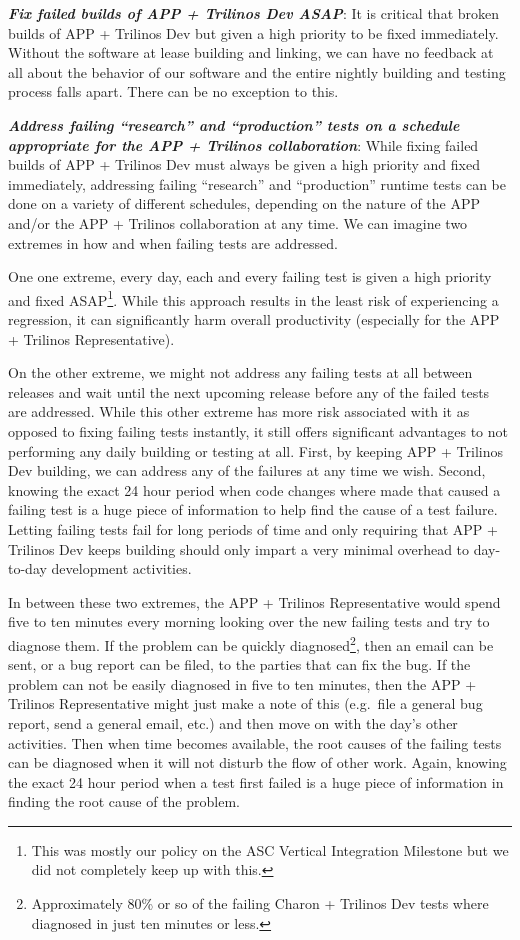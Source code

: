\documentclass[pdf,ps2pdf,11pt]{SANDreport}
\begin{document}
{}\textit{\textbf{Fix failed builds of APP + Trilinos Dev ASAP}}: It is
critical that broken builds of APP + Trilinos Dev but given a high priority to
be fixed immediately.  Without the software at lease building and linking, we
can have no feedback at all about the behavior of our software and the entire
nightly building and testing process falls apart.  There can be no exception
to this.

{}\textit{\textbf{Address failing ``research'' and ``production'' tests on a
schedule appropriate for the APP + Trilinos collaboration}}: While fixing
failed builds of APP + Trilinos Dev must always be given a high priority and
fixed immediately, addressing failing ``research'' and ``production'' runtime
tests can be done on a variety of different schedules, depending on the nature
of the APP and/or the APP + Trilinos collaboration at any time.  We can
imagine two extremes in how and when failing tests are addressed.

One one extreme, every day, each and every failing test is given a high
priority and fixed ASAP\footnote{This was mostly our policy on the ASC
Vertical Integration Milestone but we did not completely keep up with this.}.
While this approach results in the least risk of experiencing a regression, it
can significantly harm overall productivity (especially for the APP + Trilinos
Representative).

On the other extreme, we might not address any failing tests at all between
releases and wait until the next upcoming release before any of the failed
tests are addressed.  While this other extreme has more risk associated with
it as opposed to fixing failing tests instantly, it still offers significant
advantages to not performing any daily building or testing at all.  First, by
keeping APP + Trilinos Dev building, we can address any of the failures at any
time we wish.  Second, knowing the exact 24 hour period when code changes
where made that caused a failing test is a huge piece of information to help
find the cause of a test failure.  Letting failing tests fail for long periods
of time and only requiring that APP + Trilinos Dev keeps building should only
impart a very minimal overhead to day-to-day development activities.

In between these two extremes, the APP + Trilinos Representative would spend
five to ten minutes every morning looking over the new failing tests and try
to diagnose them.  If the problem can be quickly
diagnosed\footnote{Approximately 80\% or so of the failing Charon + Trilinos
Dev tests where diagnosed in just ten minutes or less.}, then an email can be
sent, or a bug report can be filed, to the parties that can fix the bug.  If
the problem can not be easily diagnosed in five to ten minutes, then the APP
+ Trilinos Representative might just make a note of this (e.g.\ file a general
bug report, send a general email, etc.) and then move on with the day's other
activities.  Then when time becomes available, the root causes of the failing
tests can be diagnosed when it will not disturb the flow of other work.
Again, knowing the exact 24 hour period when a test first failed is a huge
piece of information in finding the root cause of the problem.
\end{document}
